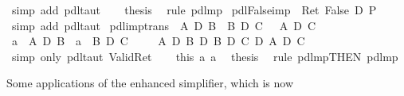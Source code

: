 \begin{isabellebody}
\ {\isacharparenleft}simp\ add{\isacharcolon}\ pdl{\isacharunderscore}taut{\isacharparenright}\isanewline
\ \ \isamarkupfalse%
\ {\isacharquery}thesis\ \isamarkupfalse%
\ {\isacharparenleft}rule\ pdl{\isacharunderscore}mp{\isacharparenright}\isanewline
\isamarkupfalse%
\isanewline
\isanewline
\isanewline
\isamarkupfalse%
\ pdl{\isacharunderscore}False{\isacharunderscore}imp{\isacharcolon}\ {\isachardoublequote}{\isasymturnstile}\ Ret\ False\ {\isasymlongrightarrow}\isactrlsub D\ P{\isachardoublequote}\isanewline
\ \ \isamarkupfalse%
\ {\isacharparenleft}simp\ add{\isacharcolon}\ pdl{\isacharunderscore}taut{\isacharparenright}\isanewline
\isanewline
\isanewline
\isamarkupfalse%
\ pdl{\isacharunderscore}imp{\isacharunderscore}trans{\isacharcolon}\ {\isachardoublequote}{\isasymlbrakk}{\isasymturnstile}\ A\ {\isasymlongrightarrow}\isactrlsub D\ B{\isacharsemicolon}\ {\isasymturnstile}\ B\ {\isasymlongrightarrow}\isactrlsub D\ C{\isasymrbrakk}\ {\isasymLongrightarrow}\ {\isasymturnstile}\ A\ {\isasymlongrightarrow}\isactrlsub D\ C{\isachardoublequote}\isanewline
\isamarkupfalse%
\ {\isacharminus}\isanewline
\ \ \isamarkupfalse%
\ a{}{\isacharcolon}\ {\isachardoublequote}{\isasymturnstile}\ A\ {\isasymlongrightarrow}\isactrlsub D\ B{\isachardoublequote}\ \ a{}{\isacharcolon}\ {\isachardoublequote}{\isasymturnstile}\ B\ {\isasymlongrightarrow}\isactrlsub D\ C{\isachardoublequote}\isanewline
\ \ \isamarkupfalse%
\ {\isachardoublequote}{\isasymturnstile}\ {\isacharparenleft}A\ {\isasymlongrightarrow}\isactrlsub D\ B{\isacharparenright}\ {\isasymlongrightarrow}\isactrlsub D\ {\isacharparenleft}B\ {\isasymlongrightarrow}\isactrlsub D\ C{\isacharparenright}\ {\isasymlongrightarrow}\isactrlsub D\ A\ {\isasymlongrightarrow}\isactrlsub D\ C{\isachardoublequote}\ \isamarkupfalse%
\ {\isacharparenleft}simp\ only{\isacharcolon}\ pdl{\isacharunderscore}taut\ Valid{\isacharunderscore}Ret{\isacharparenright}\isanewline
\ \ \isamarkupfalse%
\ this\ a{}\ a{}\ \isamarkupfalse%
\ {\isacharquery}thesis\ \isamarkupfalse%
\ {\isacharparenleft}rule\ pdl{\isacharunderscore}mp{\isacharbrackleft}THEN\ pdl{\isacharunderscore}mp{\isacharbrackright}{\isacharparenright}\isanewline
\isamarkupfalse%
\isamarkupfalse%
%
\begin{isamarkuptext}%
Some applications of the enhanced simplifier, which is now

\end{isamarkuptext}
\end{isabellebody}
